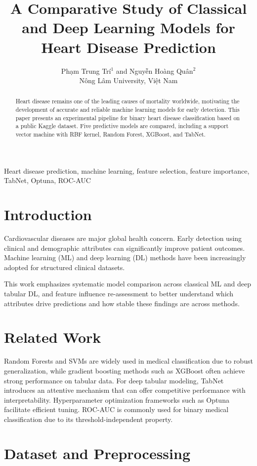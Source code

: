 \documentclass[10pt,conference]{IEEEtran}
\title{A Comparative Study of Classical and Deep Learning Models for Heart Disease Prediction}
\author{
Phạm Trung Trí$^{1}$ and Nguyễn Hoàng Quân$^{2}$\\
Nông Lâm University, Việt Nam
}
\begin{document}
\maketitle

\begin{abstract}
Heart disease remains one of the leading causes of mortality worldwide, motivating the development of accurate and reliable machine learning models for early detection. This paper presents an experimental pipeline for binary heart disease classification based on a public Kaggle dataset. Five predictive models are compared, including a support vector machine with RBF kernel, Random Forest, XGBoost, and TabNet.
\end{abstract}

\begin{IEEEkeywords}
Heart disease prediction, machine learning, feature selection, feature importance, TabNet, Optuna, ROC-AUC
\end{IEEEkeywords}

\section{Introduction}
Cardiovascular diseases are major global health concern. Early detection using clinical and demographic attributes can significantly improve patient outcomes. Machine learning (ML) and deep learning (DL) methods have been increasingly adopted for structured clinical datasets.

This work emphasizes systematic model comparison across classical ML and deep tabular DL, and feature influence re-assessment to better understand which attributes drive predictions and how stable these findings are across methods.

\section{Related Work}
Random Forests and SVMs are widely used in medical classification due to robust generalization, while gradient boosting methods such as XGBoost often achieve strong performance on tabular data. For deep tabular modeling, TabNet introduces an attentive mechanism that can offer competitive performance with interpretability. Hyperparameter optimization frameworks such as Optuna facilitate efficient tuning. ROC-AUC is commonly used for binary medical classification due to its threshold-independent property.


\section{Dataset and Preprocessing}
\end{document}
